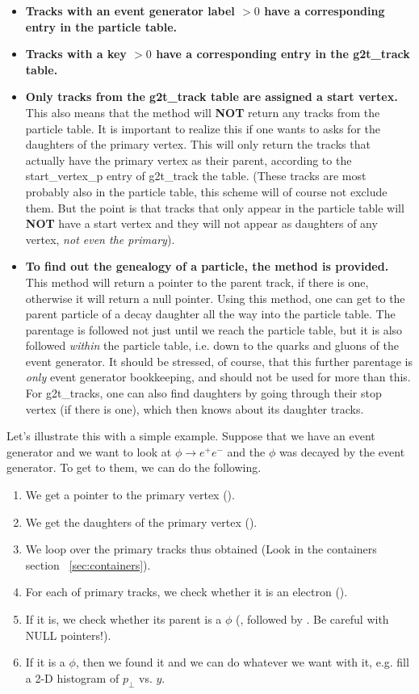 \begin{itemize}
	\item {\bf Tracks with an event generator label $> 0$ have a corresponding
	entry in the particle table.}
	\item {\bf Tracks with a key $> 0$ have a corresponding entry in the g2t\_track table.}
	\item {\bf Only tracks from the g2t\_track table are assigned a start vertex.} This also means that
	the method  will {\bf NOT} return any tracks from the particle
	table.  It is important to realize this if one wants to asks for the daughters of the
	primary vertex.  This will only return the tracks that actually have the primary
	vertex as their parent, according to the start\_vertex\_p entry of g2t\_track the table.
	(These tracks
	are most probably also in the particle table, this scheme will of course not exclude them.  But
	the point is that tracks that only appear in the particle table will {\bf NOT} have a start vertex
	and they will not appear as daughters of any vertex, {\it not even the primary}).
	\item {\bf To find out the genealogy of a particle, the  method is provided.}
	This method will return a pointer to the parent track, if there is one, otherwise it will return
	a null pointer.  Using this method, one can get to the parent particle of a decay daughter all
	the way into the particle table.  The parentage is followed not just until we reach the
	particle table, but it is also followed {\it within} the particle table, i.e. down to the quarks and gluons
	of the event generator.
	It should be stressed, of course, that
	this further parentage is {\it only} event generator bookkeeping, and should not be used for more than this.
	For g2t\_tracks, one can also find daughters by going through their stop vertex (if there is one),
	which then knows about its daughter tracks.
\end{itemize}
Let's illustrate this with a simple example.  Suppose that we have an event generator and
we want to look at $\phi \longrightarrow e^{+}e^{-}$ and the $\phi$ was decayed by the
event generator.  To get to them, we can do the following.
\begin{enumerate}
	\item We get a pointer to the primary vertex ().
	\item We get the daughters of the primary vertex ().
	\item We loop over the primary tracks thus obtained (Look in the containers section ~\ref{sec:containers}).
	\item For each of primary tracks, we check whether it is an electron ().
	\item If it is, we check whether its parent is a $\phi$ (, followed by
	.  Be careful with NULL pointers!).
	\item If it is a $\phi$, then we found it and we can do whatever we want with it, e.g. fill a 2-D
	histogram of $p_{\bot}$ vs. $y$.
\end{enumerate}
